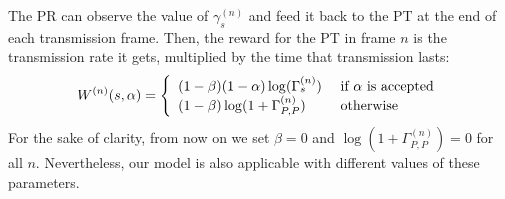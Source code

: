 The PR can observe the value of $\gamma_s^{(n)}$ and feed it back to the PT at the end of each transmission frame. Then, the reward for the PT in frame $n$ is the transmission rate it gets, multiplied by the time that transmission lasts:
\begin{equation}\label{eq:W}
W^{(n)}(s,\alpha) = \left\{ 
  \begin{array}{l l}
    (1-\beta)(1-\alpha)\log({\Gamma_s^{(n)}}) & \text{  } \text{if } \alpha \text{ is accepted}\\
    (1-\beta)\log(1+\Gamma_{P,P}^{(n)}) & \text{  } \text{otherwise}
  \end{array} \right.
\end{equation}
For the sake of clarity, from now on we set $\beta=0$ and $\log{(1+\Gamma_{P,P}^{(n)})} = 0$ for all $n$. Nevertheless, our model is also applicable with different values of these parameters. 



